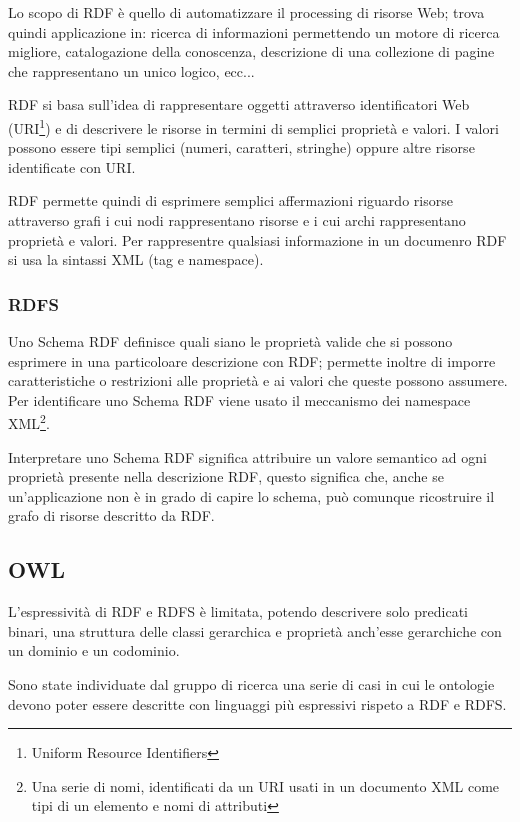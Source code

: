 Lo scopo di RDF è quello di automatizzare il processing di risorse Web; trova quindi applicazione in: ricerca di informazioni permettendo un motore di ricerca migliore, catalogazione della conoscenza, descrizione di una collezione di pagine che rappresentano un unico  logico, ecc...\cite{brickley1998resource}

RDF si basa sull'idea di rappresentare oggetti attraverso identificatori Web (URI\footnote{Uniform Resource Identifiers}) e di descrivere le risorse in termini di semplici proprietà e valori. I valori possono essere tipi semplici (numeri, caratteri, stringhe) oppure altre risorse identificate con URI.

RDF permette quindi di esprimere semplici affermazioni riguardo risorse attraverso grafi i cui nodi rappresentano risorse e i cui archi rappresentano proprietà e valori. Per rappresentre qualsiasi informazione in un documenro RDF si usa la sintassi XML (tag e namespace)\cite{manola2004rdf}.
\subsubsection{RDFS}
Uno Schema RDF definisce quali siano le proprietà valide che si possono esprimere in una particoloare descrizione con RDF; permette inoltre di imporre caratteristiche o restrizioni alle proprietà e ai valori che queste possono assumere. Per identificare uno Schema RDF viene usato il meccanismo dei namespace XML\footnote{Una serie di nomi, identificati da un URI usati in un documento XML come tipi di un elemento e nomi di attributi\cite{bray1999namespaces}}.

Interpretare uno Schema RDF significa attribuire un valore semantico ad ogni proprietà presente nella descrizione RDF, questo significa che, anche se un'applicazione non è in grado di capire lo schema, può comunque ricostruire il grafo di risorse descritto da RDF\cite{miller1998introduction}.
\subsection{OWL}
L'espressività di RDF e RDFS è limitata, potendo descrivere solo predicati binari, una struttura delle classi gerarchica e proprietà anch'esse gerarchiche con un dominio e un codominio.

Sono state individuate dal gruppo di ricerca  una serie di casi in cui le ontologie devono poter essere descritte con linguaggi più espressivi rispeto a RDF e RDFS\cite{antoniou2009web}.

